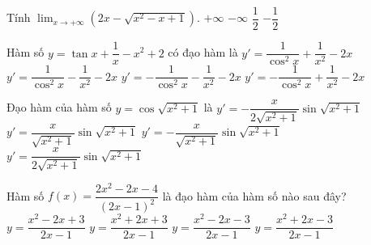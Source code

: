 \begin{ex}%
	Tính $\displaystyle \lim_{x\to+\infty}\left(2x-\sqrt{x^2-x+1}\right)$.
\choice
{\True $+\infty $}
{$-\infty $}
{$\dfrac{1}{2}$}
{$-\dfrac{1}{2}$}
 \end{ex}

\begin{ex}%
	Hàm số $y=\tan x+\dfrac{1}{x}-x^2+2$ có đạo hàm là
\choice
{$y'=\dfrac{1}{\cos^2x}+\dfrac{1}{x^2}-2x$}
{\True $y'=\dfrac{1}{\cos^2x}-\dfrac{1}{x^2}-2x$}
{$y'=-\dfrac{1}{\cos^2x}-\dfrac{1}{x^2}-2x$}
{$y'=-\dfrac{1}{\cos^2x}+\dfrac{1}{x^2}-2x$}
 \end{ex}

\begin{ex}%
	Đạo hàm của hàm số $y= \cos\sqrt{x^2+1}$ là
\choice
{$y'=-\dfrac{x}{2\sqrt{x^2+1}} \sin\sqrt{x^2+1}$}
{$y'=\dfrac{x}{\sqrt{x^2+1}} \sin\sqrt{x^2+1}$}
{\True $y'=-\dfrac{x}{\sqrt{x^2+1}} \sin\sqrt{x^2+1}$}
{$y'=\dfrac{x}{2\sqrt{x^2+1}} \sin\sqrt{x^2+1}$}
 \end{ex}

\begin{ex}%
	Hàm số $f(x)=\dfrac{2x^2-2x-4}{{\left(2x-1\right)}^2}$ là đạo hàm của hàm số nào sau đây?
\choice
{\True $y=\dfrac{x^2-2x+3}{2x-1}$}
{$y=\dfrac{x^2+2x+3}{2x-1}$}
{$y=\dfrac{x^2-2x-3}{2x-1}$}
{$y=\dfrac{x^2+2x-3}{2x-1}$}
 \end{ex}

